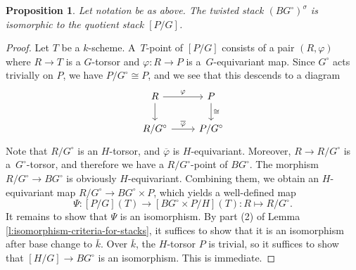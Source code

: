 \documentclass[12pt, final]{amsart}
\theoremstyle{remark}
\theoremstyle{definition}
\theoremstyle{plain}
\newtheorem{proposition}[example]{Proposition}
\begin{document}
\begin{proposition}\label{p:inner} Let notation be as above. 
     The twisted stack $(BG^{\circ})^{\sigma}$ is isomorphic to the quotient stack $[P/G]$.
\end{proposition}

\begin{proof}
    Let $T$ be a $k$-scheme.   
    A~$T$-point of $[P/G]$ consists of a pair $(R,\varphi)$ where $R\to T$ is a $G$-torsor and $\varphi\colon R\to P$ is a~$G$-equivariant map. Since $G^{\circ}$ acts trivially on $P$, we have $P/G^{\circ} \cong P$, and we see that this descends to a diagram
    $$
    \begin{tikzcd}
        R & P \\
        {R/G^\circ} & {P/G^\circ}
        \arrow["\varphi", from=1-1, to=1-2]
        \arrow[from=1-1, to=2-1]
        \arrow["\cong", from=1-2, to=2-2]
        \arrow["{\overline{\varphi}}", from=2-1, to=2-2]
    \end{tikzcd}
    $$ Note that $R/G^{\circ}$ is an $H$-torsor, and $\overline{\varphi}$ is $H$-equivariant. Moreover, $R \to R/G^\circ$ is a~$G^\circ$-torsor, and therefore we have a $R/G^\circ$-point of $BG^\circ$. The morphism $R/G^{\circ} \to BG^{\circ}$ is obviously $H$-equivariant. Combining them, we obtain an $H$-equivariant map $R/G^{\circ} \to BG^{\circ} \times P$, which yields a well-defined map
    \[
       \Psi \colon \left[P/G\right](T) \to \left[BG^{\circ}\times P/H\right](T) \colon R \mapsto R/G^{\circ}.
    \] It remains to show that $\Psi$ is an isomorphism. By part (2) of Lemma \ref{l:isomorphism-criteria-for-stacks}, it suffices to show that it is an isomorphism after base change to $\bar{k}$. 
Over $\bar{k}$, the $H$-torsor $P$ is trivial, so it suffices to show that $\left[H/G\right] \to BG^{\circ}$ is an isomorphism. 
    This is immediate.
\end{proof}

\end{document}
